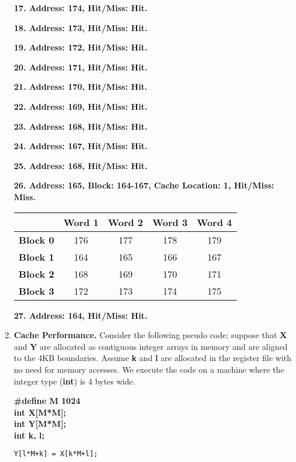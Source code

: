 \documentclass[a4paper, 11pt]{exam}
\begin{document}
\begin{enumerate}
\textbf{17. Address: 174, Hit/Miss: Hit.}

\textbf{18. Address: 173, Hit/Miss: Hit.}

\textbf{19. Address: 172, Hit/Miss: Hit.}

\textbf{20. Address: 171, Hit/Miss: Hit.}

\textbf{21. Address: 170, Hit/Miss: Hit.}

\textbf{22. Address: 169, Hit/Miss: Hit.}

\textbf{23. Address: 168, Hit/Miss: Hit.}

\textbf{24. Address: 167, Hit/Miss: Hit.}

\textbf{25. Address: 168, Hit/Miss: Hit.}

\textbf{26. Address: 165, Block: 164-167, Cache Location: 1, Hit/Miss: Miss.}

\begin{center}
	\begin{tabular}{ |c|c|c|c|c| } 
		\hline
		&\textbf{Word 1}& \textbf{Word 2}& \textbf{Word 3} & \textbf{Word 4}\\ 
		\hline
		\textbf{Block 0} &  176 &  177 & 178 & 179\\ 
		\hline
		\textbf{Block 1} &  164 & 165 & 166 & 167\\ 
		\hline
		\textbf{Block 2} & 168 & 169  & 170 & 171\\ 
		\hline
		\textbf{Block 3} & 172 & 173 & 174 & 175\\ 
		\hline
	\end{tabular}
\end{center}

\textbf{27. Address: 164, Hit/Miss: Hit.}



\item \textbf{Cache Performance.}
Consider the following  pseudo code; suppose that \textbf{X} and \textbf{Y} are allocated as contiguous integer arrays in memory and are aligned to the 4KB boundaries.
Assume \textbf{k} and \textbf{l} are allocated in the register file with no need for memory accesses.
We execute the code on a machine where the integer type (\textbf{int}) is 4 bytes wide.

	\begin{algorithm}
		\textbf{\#define M 1024} \\
		\textbf{int X[M*M];} \\
		\textbf{int Y[M*M];} \\
		\textbf{int k, l;}
		\begin{algorithmic}	
			\STATE \texttt{Y[l*M+k] = X[k*M+l];}
			\ENDFOR
			\ENDFOR
		\end{algorithmic}
	\end{algorithm}


\end{enumerate}
\end{document}
